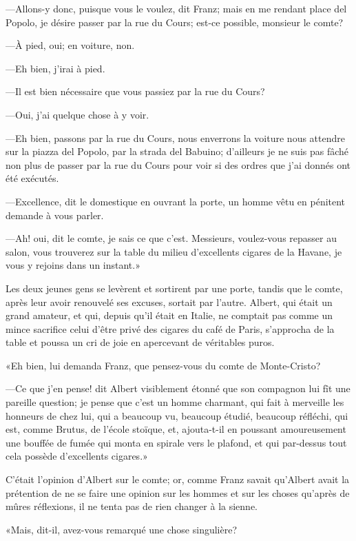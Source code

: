 —Allons-y donc, puisque vous le voulez, dit Franz; mais en me rendant place del Popolo, je désire passer par la rue du Cours; est-ce possible, monsieur le comte? 

—À pied, oui; en voiture, non. 

—Eh bien, j'irai à pied. 

—Il est bien nécessaire que vous passiez par la rue du Cours? 

—Oui, j'ai quelque chose à y voir. 

—Eh bien, passons par la rue du Cours, nous enverrons la voiture nous attendre sur la piazza del Popolo, par la strada del Babuino; d'ailleurs je ne suis pas fâché non plus de passer par la rue du Cours pour voir si des ordres que j'ai donnés ont été exécutés. 

—Excellence, dit le domestique en ouvrant la porte, un homme vêtu en pénitent demande à vous parler. 

—Ah! oui, dit le comte, je sais ce que c'est. Messieurs, voulez-vous repasser au salon, vous trouverez sur la table du milieu d'excellents cigares de la Havane, je vous y rejoins dans un instant.» 

Les deux jeunes gens se levèrent et sortirent par une porte, tandis que le comte, après leur avoir renouvelé ses excuses, sortait par l'autre. Albert, qui était un grand amateur, et qui, depuis qu'il était en Italie, ne comptait pas comme un mince sacrifice celui d'être privé des cigares du café de Paris, s'approcha de la table et poussa un cri de joie en apercevant de véritables puros. 

«Eh bien, lui demanda Franz, que pensez-vous du comte de Monte-Cristo? 

—Ce que j'en pense! dit Albert visiblement étonné que son compagnon lui fît une pareille question; je pense que c'est un homme charmant, qui fait à merveille les honneurs de chez lui, qui a beaucoup vu, beaucoup étudié, beaucoup réfléchi, qui est, comme Brutus, de l'école stoïque, et, ajouta-t-il en poussant amoureusement une bouffée de fumée qui monta en spirale vers le plafond, et qui par-dessus tout cela possède d'excellents cigares.» 

C'était l'opinion d'Albert sur le comte; or, comme Franz savait qu'Albert avait la prétention de ne se faire une opinion sur les hommes et sur les choses qu'après de mûres réflexions, il ne tenta pas de rien changer à la sienne. 

«Mais, dit-il, avez-vous remarqué une chose singulière? 

